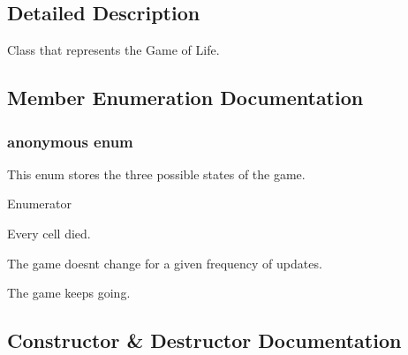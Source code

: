 \subsection{Detailed Description}
Class that represents the Game of Life. 

\subsection{Member Enumeration Documentation}
\subsubsection[{anonymous enum}]{\setlength{\rightskip}{0pt plus 5cm}anonymous enum}\hypertarget{classField_aa6d508a405365e5a6c0414885e525f0c}{}\label{classField_aa6d508a405365e5a6c0414885e525f0c}
This enum stores the three possible states of the game. \begin{Desc}
\item[Enumerator]\par
\begin{description}
\item[{\em 
E\+X\+T\+I\+N\+CT\hypertarget{classField_aa6d508a405365e5a6c0414885e525f0ca56fae498f50c63150db6f0a62f5e1fca}{}\label{classField_aa6d508a405365e5a6c0414885e525f0ca56fae498f50c63150db6f0a62f5e1fca}
}]Every cell died. \item[{\em 
S\+T\+A\+B\+LE\hypertarget{classField_aa6d508a405365e5a6c0414885e525f0cabbd2d19da019f8f32b0996513f0a3bf6}{}\label{classField_aa6d508a405365e5a6c0414885e525f0cabbd2d19da019f8f32b0996513f0a3bf6}
}]The game doesn\textquotesingle{}t change for a given frequency of updates. \item[{\em 
N\+O\+R\+M\+AL\hypertarget{classField_aa6d508a405365e5a6c0414885e525f0ca4b7abbee7590e23286d7583cb23e24ee}{}\label{classField_aa6d508a405365e5a6c0414885e525f0ca4b7abbee7590e23286d7583cb23e24ee}
}]The game keeps going. \end{description}
\end{Desc}


\subsection{Constructor \& Destructor Documentation}
